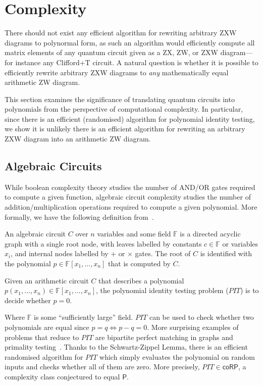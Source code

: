 \section{Complexity}

There should not exist any efficient algorithm for rewriting arbitrary ZXW diagrams to polynormal form, as such an algorithm would efficiently compute all matrix elements of any quantum circuit given as a ZX, ZW, or ZXW diagram---for instance any Clifford+T circuit. A natural question is whether it is possible to efficiently rewrite arbitrary ZXW diagrams to \emph{any} mathematically equal arithmetic ZW diagram.

This section examines the significance of translating quantum circuits into polynomials from the perspective of computational complexity.
In particular, since there is an efficient (randomised) algorithm for polynomial identity testing, we show it is unlikely there is an efficient algorithm for rewriting an arbitrary ZXW diagram into an arithmetic ZW diagram.

\subsection{Algebraic Circuits}

While boolean complexity theory studies the number of AND/OR gates required to compute a given function, algebraic circuit complexity studies the number of addition/multiplication operations required to compute a given polynomial. More formally, we have the following definition from~\cite{shpilka2010arithmetic}.

\begin{definition}
	An algebraic circuit $C$ over $n$ variables and some field $\mathbb{F}$ is a directed acyclic graph with a single root node, with leaves labelled by constants $c \in \mathbb{F}$ or variables $x_i$, and internal nodes labelled by $+$ or $\times$ gates. The root of $C$ is identified with the polynomial $p \in \mathbb{F}[x_1, ..., x_n]$ that is computed by $C$.
\end{definition}


\begin{definition}
    Given an arithmetic circuit $C$ that describes a polynomial $p(x_1, ..., x_n) \in \mathbb{F}[x_1, ..., x_n]$, the polynomial identity testing problem ($PIT$) is to decide whether $p = 0$.
\end{definition}

Where $\mathbb{F}$ is some ``sufficiently large'' field. $PIT$ can be used to check whether two polynomials are equal since $p = q \iff p-q = 0$. More surprising examples of problems that reduce to $PIT$ are bipartite perfect matching in graphs and primality testing~\cite{saxena2009progress}. Thanks to the Schwartz-Zippel Lemma, there is an efficient randomised algorithm for $PIT$ which simply evaluates the polynomial on random inputs and checks whether all of them are zero. More precisely, $PIT \in \mathsf{coRP}$, a complexity class conjectured to equal $\mathsf{P}$.


